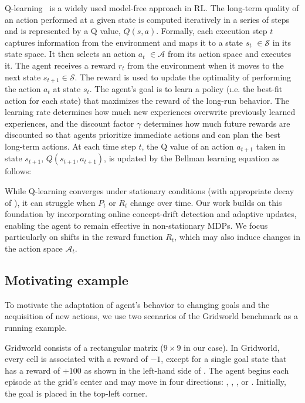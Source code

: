 Q-learning~\cite{watkins92} is a widely used model-free approach in \ac{RL}. The long-term quality of an action performed at a given state is computed iteratively in a series of steps and is represented by a Q value,
$\mathit{Q(s,a)}$.
Formally, each execution step $t$ captures information from the environment and maps it to a state
{\color{purple}$s_t$} $\in \mathcal{S}$ in its state space. It then selects an
action {\color{purple}$a_t$} $\in \mathcal{A}$ from its action space and executes it. The agent
receives a reward {\color{Bittersweet}$r_t$} from the environment when it moves to the next state
$s_{t+1} \in \mathcal{S}$. The reward is used to update the optimality of performing the
action {\color{Mulberry}$a_t$} at state {\color{purple}$s_t$}. The agent's goal is to learn
a policy (\i.e. the best-fit action for each state) that maximizes the reward of the
long-run behavior. The learning rate \lrate{\alpha} determines how much new experiences 
overwrite previously learned experiences, and the discount factor {\color{RoyalBlue} $\gamma$} 
determines how much future rewards are discounted so that agents prioritize immediate actions and 
can plan the best long-term actions. At each time step $t$, the Q value of an action 
{\color{purple}$a_{t+1}$} taken in state {\color{purple}$s_{t+1}$}, $Q(s_{t+1}, a_{t+1})$, is updated by 
the Bellman learning equation as follows:

\vspace{1em}

\vspace{1em}

While Q-learning converges under stationary conditions (with appropriate decay of \lrate{\alpha}), it 
can struggle when $P_t$ or $R_t$ change over time. Our work builds on this foundation by 
incorporating online concept-drift detection and adaptive updates, enabling the agent to remain 
effective in non-stationary MDPs. We focus particularly on shifts in the reward function $R_t$, which 
may also induce changes in the action space $\mathcal{A}_t$.


\subsection{Motivating example}
\label{sec:motivation}


To motivate the adaptation of agent's behavior to changing goals and the acquisition of new actions, 
we use two scenarios of the Gridworld benchmark as a running example.

Gridworld consists of a rectangular matrix ($9\times 9$ in our case). In Gridworld, every cell is 
associated with a reward of $-1$, except for a single goal state that has a reward of $+100$ as shown 
in the left-hand side of . The agent begins each episode at the grid's center and may 
move in four directions: , , , or . Initially, the goal is placed in the 
top-left corner.  

